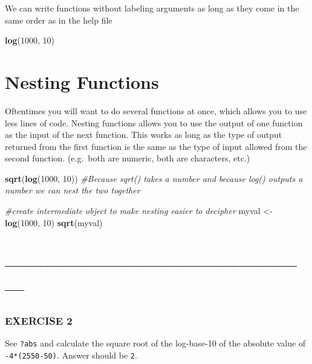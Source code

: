 \documentclass[]{article}
\newenvironment{Shaded}{\begin{snugshade}}{\end{snugshade}}
\newcommand{\KeywordTok}[1]{\textcolor[rgb]{0.13,0.29,0.53}{\textbf{{#1}}}}
\newcommand{\DecValTok}[1]{\textcolor[rgb]{0.00,0.00,0.81}{{#1}}}
\newcommand{\StringTok}[1]{\textcolor[rgb]{0.31,0.60,0.02}{{#1}}}
\newcommand{\CommentTok}[1]{\textcolor[rgb]{0.56,0.35,0.01}{\textit{{#1}}}}
\newcommand{\NormalTok}[1]{{#1}}
\begin{document}
We can write functions without labeling arguments as long as they come
in the same order as in the help file

\begin{Shaded}
\begin{Highlighting}[]
\KeywordTok{log}\NormalTok{(}\DecValTok{1000}\NormalTok{, }\DecValTok{10}\NormalTok{)}
\end{Highlighting}
\end{Shaded}

\section{Nesting Functions}\label{nesting-functions}

Oftentimes you will want to do several functions at once, which allows
you to use less lines of code. Nesting functions allows you to use the
output of one function as the input of the next function. This works as
long as the type of output returned from the first function is the same
as the type of input allowed from the second function. (e.g.~both are
numeric, both are characters, etc.)

\begin{Shaded}
\begin{Highlighting}[]
\KeywordTok{sqrt}\NormalTok{(}\KeywordTok{log}\NormalTok{(}\DecValTok{1000}\NormalTok{, }\DecValTok{10}\NormalTok{))}
\CommentTok{#Because sqrt() takes a number and because log() outputs a number we can nest the two together}

\CommentTok{#create intermediate object to make nesting easier to decipher}
\NormalTok{myval <-}\StringTok{ }\KeywordTok{log}\NormalTok{(}\DecValTok{1000}\NormalTok{, }\DecValTok{10}\NormalTok{)}
\KeywordTok{sqrt}\NormalTok{(myval)}
\end{Highlighting}
\end{Shaded}

\section{------------------------------------------------}\label{section-1}

\subsubsection{EXERCISE 2}\label{exercise-2}

See \texttt{?abs} and calculate the square root of the log-base-10 of
the absolute value of \texttt{-4*(2550-50)}. Answer should be
\texttt{2}.
\end{document}

